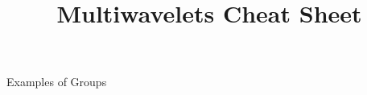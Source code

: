 \documentclass[14pt]{extarticle}
\title{Multiwavelets Cheat Sheet}
\begin{document}
	\maketitle

	\begin{outline}		
		\1	Examples of Groups
	\end{outline}
\end{document}
